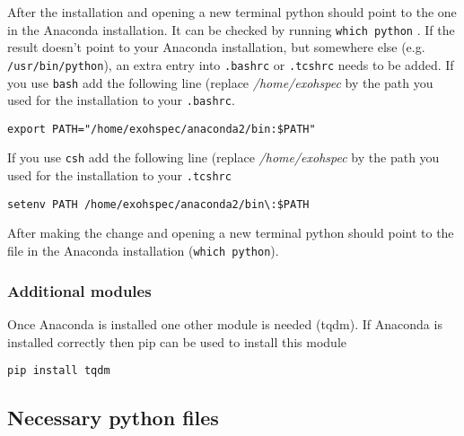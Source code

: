 \documentclass[10pt,a4paper]{article}
\begin{document}
After the installation and opening a new terminal python should point to the one in the Anaconda installation. It can be checked by running \verb|which python| . If the result doesn't point to your Anaconda installation, but somewhere else (e.g. \verb|/usr/bin/python|), an extra entry into \verb|.bashrc| or \verb|.tcshrc| needs to be added. If you use \verb|bash| add the following line (replace \textit{/home/exohspec} by the path you used for the installation to your \verb|.bashrc|. %
\begin{lstlisting}[style=base]
export PATH="/home/exohspec/anaconda2/bin:$PATH"
\end{lstlisting}
If you use \verb|csh| add the following line (replace \textit{/home/exohspec} by the path you used for the installation to your \verb|.tcshrc|
\begin{lstlisting}[style=base]
setenv PATH /home/exohspec/anaconda2/bin\:$PATH
\end{lstlisting}

After making the change and opening a new terminal python should point to the file in the Anaconda installation (\verb|which python|).

\subsubsection{Additional modules}

\noindent Once Anaconda is installed one other module is needed (tqdm). If Anaconda is installed correctly then pip can be used to install this module
\begin{lstlisting}[style=base]
pip install tqdm
\end{lstlisting}



\subsection{Necessary python files}
\end{document}
